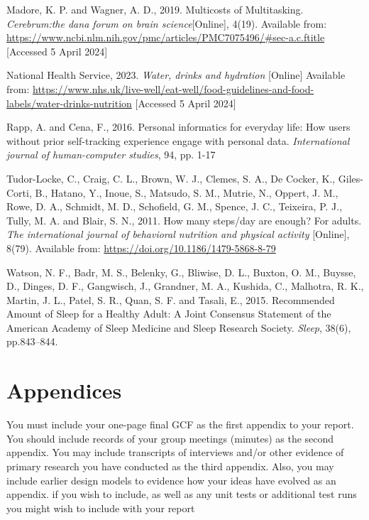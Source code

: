 \documentclass[12pt]{article}
\begin{document}
\begin{thebibliography}{99}
    Madore, K. P. and Wagner, A. D., 2019. Multicosts of Multitasking. 
    \textit{Cerebrum:the dana forum on brain science}[Online], 4(19). Available from:
    \url{https://www.ncbi.nlm.nih.gov/pmc/articles/PMC7075496/#sec-a.c.ftitle} 
    [Accessed 5 April 2024]

    National Health Service, 2023. \textit{Water, drinks and hydration} [Online] 
    Available from: 
    \url{https://www.nhs.uk/live-well/eat-well/food-guidelines-and-food-labels/water-drinks-nutrition} 
    [Accessed 5 April 2024]
    
    Rapp, A. and Cena, F., 2016. Personal informatics for everyday life: 
    How users without prior self-tracking experience engage with personal data. 
    \textit{International journal of human-computer studies}, 94, pp. 1-17

    Tudor-Locke, C., Craig, C. L., Brown, W. J., Clemes, S. A., De Cocker, K., 
    Giles-Corti, B., Hatano, Y., Inoue, S., Matsudo, S. M., Mutrie, N., Oppert, J. M., Rowe, D. A., 
    Schmidt, M. D., Schofield, G. M., Spence, J. C., Teixeira, P. J., Tully, M. A. and Blair, S. N., 2011. 
    How many steps/day are enough? For adults. 
    \textit{The international journal of behavioral nutrition and physical activity} 
    [Online], 8(79). Available from: \url{https://doi.org/10.1186/1479-5868-8-79}

    Watson, N. F., Badr, M. S., Belenky, G., Bliwise, D. L., Buxton, O. M., Buysse, D., 
    Dinges, D. F., Gangwisch, J., Grandner, M. A., Kushida, C., Malhotra, R. K., Martin, J. L., Patel, S. R., 
    Quan, S. F. and Tasali, E., 2015. 
    Recommended Amount of Sleep for a Healthy Adult: 
    A Joint Consensus Statement of the American Academy of Sleep Medicine and Sleep Research Society. 
    \textit{Sleep}, 38(6), pp.843–844.
\end{thebibliography}


\section{Appendices}
You must include your one-page final GCF as the first appendix to your report. You should
include records of your group meetings (minutes) as the second appendix. You may include
transcripts of interviews and/or other evidence of primary research you have conducted as
the third appendix.
Also, you may include earlier design models to evidence how your ideas have evolved as an
appendix. if you wish to include, as well as any unit tests or additional test runs you might
wish to include with your report
\end{document}
